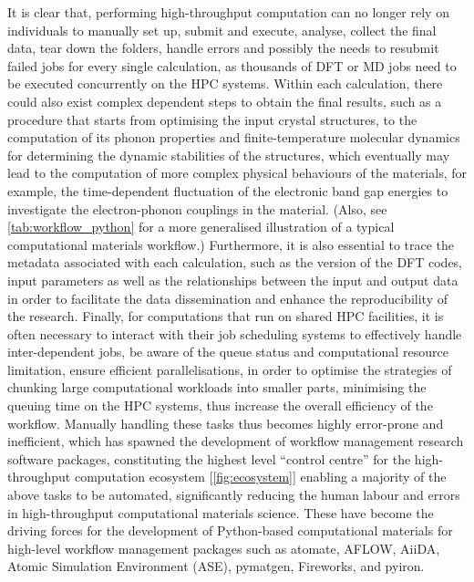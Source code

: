 It is clear that, performing high-throughput computation can no longer rely on individuals to manually set up, submit and execute, analyse, collect the final data, tear down the folders, handle errors and possibly the needs to resubmit failed jobs for every single calculation, as thousands of DFT or MD jobs need to be executed concurrently on the HPC systems.  Within each calculation, there could also exist complex dependent steps to obtain the final results, such as a procedure\cite{yang2021altas} that starts from optimising the input crystal structures, to the computation of its phonon properties and finite-temperature molecular dynamics for determining the dynamic stabilities of the structures, which eventually may lead to the computation of more complex physical behaviours of the materials, for example, the time-dependent fluctuation of the electronic band gap energies to investigate the electron-phonon couplings in the material.\cite{yang2022mapping} (Also, see \cref{tab:workflow_python} for a more generalised illustration of a typical computational materials workflow.) Furthermore, it is also essential to trace the metadata associated with each calculation, such as the version of the DFT codes, input parameters as well as the relationships between the input and output data in order to facilitate the data dissemination and enhance the reproducibility of the research. Finally, for computations that run on shared HPC facilities, it is often necessary to interact with their job scheduling systems to effectively handle inter-dependent jobs, be aware of the queue status and computational resource limitation, ensure efficient parallelisations, in order to optimise the strategies of chunking large computational workloads into smaller parts, minimising the queuing time on the HPC systems, thus increase the overall efficiency of the workflow. Manually handling these tasks thus becomes highly error-prone and inefficient, which has spawned the development of workflow management research software packages, constituting the highest level ``control centre'' for the high-throughput computation ecosystem [\cref{fig:ecosystem}] enabling a majority of the above tasks to be automated, significantly reducing the human labour and errors in  high-throughput computational materials science. These have become the driving forces for the development of Python-based computational materials for high-level workflow management packages such as atomate,\cite{mathew2017atomate} AFLOW,\cite{CURTAROLO2012218} AiiDA,\cite{uhrin2021workflows,huber2020aiida} Atomic Simulation Environment (ASE),\cite{larsen2017atomic} 
pymatgen,\cite{ong2013python} Fireworks,\cite{jain2015fireworks}  and pyiron.\cite{janssen2019pyiron}

